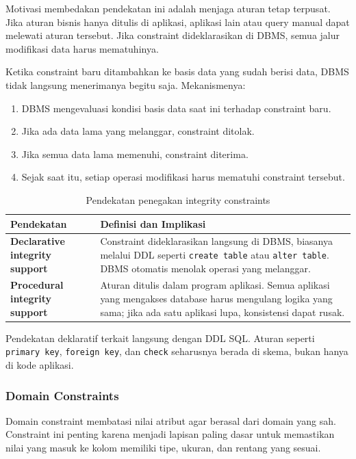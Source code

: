 Motivasi membedakan pendekatan ini adalah menjaga aturan tetap terpusat. Jika aturan bisnis hanya ditulis di aplikasi, aplikasi lain atau query manual dapat melewati aturan tersebut. Jika constraint dideklarasikan di DBMS, semua jalur modifikasi data harus mematuhinya.

Ketika constraint baru ditambahkan ke basis data yang sudah berisi data, DBMS tidak langsung menerimanya begitu saja. Mekanismenya:
\begin{enumerate}
    \item DBMS mengevaluasi kondisi basis data saat ini terhadap constraint baru.
    \item Jika ada data lama yang melanggar, constraint ditolak.
    \item Jika semua data lama memenuhi, constraint diterima.
    \item Sejak saat itu, setiap operasi modifikasi harus mematuhi constraint tersebut.
\end{enumerate}

\begin{table}[H]
\centering
\begin{tabularx}{\textwidth}{|L{0.30\textwidth}|X|}
\hline
\textbf{Pendekatan} & \textbf{Definisi dan Implikasi} \\
\hline
\textbf{Declarative integrity support} & Constraint dideklarasikan langsung di DBMS, biasanya melalui DDL seperti \texttt{create table} atau \texttt{alter table}. DBMS otomatis menolak operasi yang melanggar. \\
\hline
\textbf{Procedural integrity support} & Aturan ditulis dalam program aplikasi. Semua aplikasi yang mengakses database harus mengulang logika yang sama; jika ada satu aplikasi lupa, konsistensi dapat rusak. \\
\hline
\end{tabularx}
\caption{Pendekatan penegakan integrity constraints}
\label{tab:declarative-procedural}
\end{table}

Pendekatan deklaratif terkait langsung dengan DDL SQL. Aturan seperti \texttt{primary key}, \texttt{foreign key}, dan \texttt{check} seharusnya berada di skema, bukan hanya di kode aplikasi.

\subsubsection{Domain Constraints}

\begin{jawab}
Domain constraint membatasi nilai atribut agar berasal dari domain yang sah. Constraint ini penting karena menjadi lapisan paling dasar untuk memastikan nilai yang masuk ke kolom memiliki tipe, ukuran, dan rentang yang sesuai.
\end{jawab}

